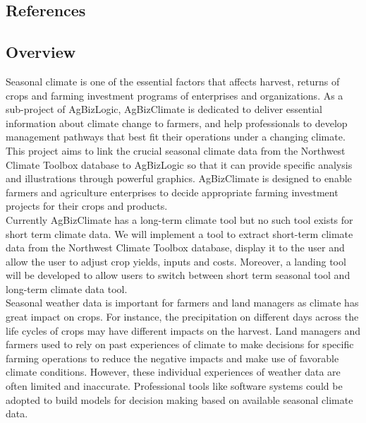 \documentclass[onecolumn, draftclsnofoot,10pt, compsoc]{article}
\begin{document}
			\renewcommand\refname{\vskip -1cm}
		\subsection{References}

		\nocite{*}
    
    


		\subsection{Overview}
			Seasonal climate is one of the essential factors that affects harvest, returns of crops and farming investment programs of enterprises and organizations. As a sub-project of AgBizLogic, AgBizClimate is dedicated to deliver essential information about climate change to farmers, and help professionals to develop management pathways that best fit their operations under a changing climate. This project aims to link the crucial seasonal climate data from the Northwest Climate Toolbox database to AgBizLogic so that it can provide specific analysis and illustrations through powerful graphics. AgBizClimate is designed to enable farmers and agriculture enterprises to decide appropriate farming investment projects for their crops and products.\\

            Currently AgBizClimate has a long-term climate tool but no such tool exists for short term climate data. We will implement a tool to extract short-term climate data from the Northwest Climate Toolbox database, display it to the user and allow the user to adjust crop yields, inputs and costs. Moreover, a landing tool will be developed to allow users to switch between short term seasonal tool and long-term climate data tool.\\

            Seasonal weather data is important for farmers and land managers as climate has great impact on crops. For instance, the precipitation on different days across the life cycles of crops may have different impacts on the harvest. Land managers and farmers used to rely on past experiences of climate to make decisions for specific farming operations to reduce the negative impacts and make use of favorable climate conditions. However, these individual experiences of weather data are often limited and inaccurate. Professional tools like software systems could be adopted to build models for decision making based on available seasonal climate data.\\
\end{document}
